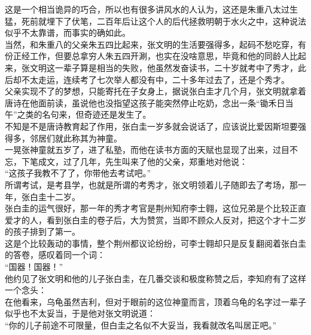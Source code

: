 \begin{multicols}{\theparacolNo}
这是一个相当诡异的巧合，所以也有很多讲风水的人认为，这还是朱重八太过生猛，死前就埋下了伏笔，二百年后让这个人的后代拯救明朝于水火之中，这种说法似乎不太靠谱，而事实的确如此。\\

当然，和朱重八的父亲朱五四比起来，张文明的生活要强得多，起码不愁吃穿，有份正经工作，但要总拿穷人朱五四开涮，也实在没啥意思，毕竟和他的同龄人比起来，张文明这一辈子算是相当的失败，他虽然发奋读书，二十岁就考中了秀才，此后却不太走运，连续考了七次举人都没有中，二十多年过去了，还是个秀才。\\

父亲实现不了的梦想，只能寄托在子女身上，据说张白圭才几个月，张文明就拿着唐诗在他面前读，虽说他也没指望这孩子能突然停止吃奶，念出一条“锄禾日当午”之类的名句来，但奇迹还是发生了。\\

不知是不是唐诗教育起了作用，张白圭一岁多就会说话了，应该说比爱因斯坦要强得多，邻居们就此称其为神童。\\

一晃张神童就五岁了，进了私塾，而他在读书方面的天赋也显现了出来，过目不忘，下笔成文，过了几年，先生叫来了他的父亲，郑重地对他说：\\

“这孩子我教不了了，你带他去考试吧。”\\

所谓考试，是考县学，也就是所谓的考秀才，张文明领着儿子随即去了考场，那一年，张白圭十二岁。\\

张白圭的运气很好，那一年的秀才考官是荆州知府李士翱，这位兄弟是个比较正直爱才的人，看到张白圭的卷子后，大为赞赏，当即不顾众人反对，把这个才十二岁的孩子排到了第一。\\

这是个比较轰动的事情，整个荆州都议论纷纷，可李士翱却只是反复翻阅着张白圭的答卷，感叹着同一个词：\\

“国器！国器！”\\

他约见了张文明和他的儿子张白圭，在几番交谈和极度称赞之后，李知府有了这样一个念头：\\

在他看来，乌龟虽然吉利，但对于眼前的这位神童而言，顶着乌龟的名字过一辈子似乎也不太妥当，于是他对张文明说道：\\

“你的儿子前途不可限量，但白圭之名似不大妥当，我看就改名叫居正吧。”\\


\end{multicols}

